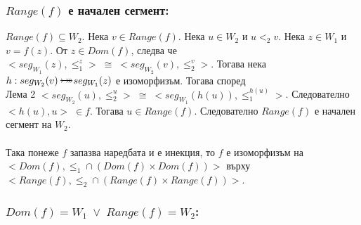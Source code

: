 \documentclass[12pt]{article}
\newcommand{\bijection}[0]{\mathbin{\mathlarger{\mathlarger{\rightarrowtail}} \hspace{-14pt} \mathlarger{\mathlarger{\twoheadrightarrow}}}}
\begin{document}
\subsubsection*{\(Range(f)\) е начален сегмент:}
\(Range(f) \subseteq W_2\).
Нека \(v \in Range(f)\). Нека \(u \in W_2\) и \(u <_2 v\).
Нека \(z \in W_1\) и \(v = f(z)\).
От \(z \in Dom(f)\), следва че
\(<seg_{W_1}(z), \leq_1^z> \; \cong \; <seg_{W_2}(v), \leq_2^{v}>\).
Тогава нека \(h : seg_{W_2}(v) \bijection seg_{W_1}(z)\) е изоморфизъм.
Тогава според \\
Лема 2
\(<seg_{W_2}(u), \leq_2^u> \; \cong \; <seg_{W_1}(h(u)), \leq_1^{h(u)}>\).
Следователно
\\
\(<h(u), u> \; \in f\).
Тогава \(u \in Range(f)\).
Следователно \(Range(f)\) е начален сегмент на \(W_2\).
\\
\vspace{1mm}
\\
Така понеже \(f\) запазва наредбата и е инекция, то \(f\) е изоморфизъм на
\\
\(<Dom(f), \leq_1 \cap (Dom(f) \times Dom(f))>\)
върху
\\
\(<Range(f), \leq_2 \cap (Range(f) \times Range(f))>\).

\subsubsection*{\(Dom(f) = W_1 \; \lor \; Range(f) = W_2\):}
\end{document}
